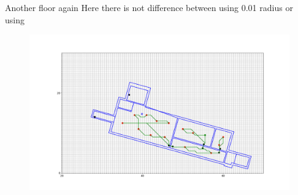 Another floor again
Here there is not difference between using 0.01 radius or using 
\begin{figure}[H]
    \centering
    \includegraphics[width=1\textwidth]{fig/Resultater/127/-3.43_min_height.png}
    \label{Rum knudepu}
    \caption[Design overview]{}
\end{figure}